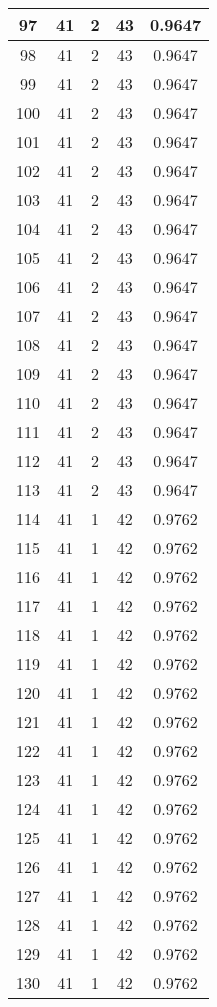 \documentclass[letterpaper, 12pt]{article}
\begin{document}
\begin{longtable}{|c|c|c|c|c|}
\hline
97 & 41 & 2 & 43 & 0.9647 \\
\hline
98 & 41 & 2 & 43 & 0.9647 \\
\hline
99 & 41 & 2 & 43 & 0.9647 \\
\hline
100 & 41 & 2 & 43 & 0.9647 \\
\hline
101 & 41 & 2 & 43 & 0.9647 \\
\hline
102 & 41 & 2 & 43 & 0.9647 \\
\hline
103 & 41 & 2 & 43 & 0.9647 \\
\hline
104 & 41 & 2 & 43 & 0.9647 \\
\hline
105 & 41 & 2 & 43 & 0.9647 \\
\hline
106 & 41 & 2 & 43 & 0.9647 \\
\hline
107 & 41 & 2 & 43 & 0.9647 \\
\hline
108 & 41 & 2 & 43 & 0.9647 \\
\hline
109 & 41 & 2 & 43 & 0.9647 \\
\hline
110 & 41 & 2 & 43 & 0.9647 \\
\hline
111 & 41 & 2 & 43 & 0.9647 \\
\hline
112 & 41 & 2 & 43 & 0.9647 \\
\hline
113 & 41 & 2 & 43 & 0.9647 \\
\hline
114 & 41 & 1 & 42 & 0.9762 \\
\hline
115 & 41 & 1 & 42 & 0.9762 \\
\hline
116 & 41 & 1 & 42 & 0.9762 \\
\hline
117 & 41 & 1 & 42 & 0.9762 \\
\hline
118 & 41 & 1 & 42 & 0.9762 \\
\hline
119 & 41 & 1 & 42 & 0.9762 \\
\hline
120 & 41 & 1 & 42 & 0.9762 \\
\hline
121 & 41 & 1 & 42 & 0.9762 \\
\hline
122 & 41 & 1 & 42 & 0.9762 \\
\hline
123 & 41 & 1 & 42 & 0.9762 \\
\hline
124 & 41 & 1 & 42 & 0.9762 \\
\hline
125 & 41 & 1 & 42 & 0.9762 \\
\hline
126 & 41 & 1 & 42 & 0.9762 \\
\hline
127 & 41 & 1 & 42 & 0.9762 \\
\hline
128 & 41 & 1 & 42 & 0.9762 \\
\hline
129 & 41 & 1 & 42 & 0.9762 \\
\hline
130 & 41 & 1 & 42 & 0.9762 \\

\end{longtable}
\end{document}
